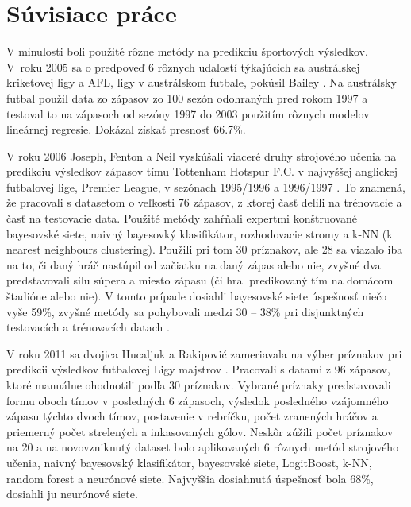 \section*{Súvisiace práce}

V minulosti boli použité rôzne metódy na predikciu športových výsledkov.
V~roku 2005 sa o predpoveď 6 rôznych udalostí týkajúcich sa austrálskej kriketovej ligy a AFL, ligy v austrálskom futbale, pokúsil Bailey \citep{related:bailey}. 
Na austrálsky futbal použil data zo zápasov zo 100 sezón odohraných pred rokom 1997 a testoval to na zápasoch od sezóny 1997 do 2003 použitím rôznych modelov lineárnej regresie. 
Dokázal získať presnosť 66.7\%.

V roku 2006 Joseph, Fenton a Neil vyskúšali viaceré druhy strojového učenia na predikciu výsledkov zápasov tímu Tottenham Hotspur F.C. v najvyššej anglickej futbalovej lige, Premier League, v sezónach 1995/1996 a 1996/1997 \citep{related:joseph}.
To znamená, že pracovali s datasetom o veľkosti 76 zápasov, z ktorej časť delili na trénovacie a časť na testovacie data. 
Použité metódy zahŕňali expertmi konštruované bayesovské siete, naivný bayesovký klasifikátor, rozhodovacie stromy a k-NN (k nearest neighbours clustering). 
Použili pri tom 30 príznakov, ale 28 sa viazalo iba na to, či daný hráč nastúpil od začiatku na daný zápas alebo nie, zvyšné dva predstavovali silu súpera a miesto zápasu (či hral predikovaný tím na domácom štadióne alebo nie).
V tomto prípade dosiahli bayesovské siete úspešnosť niečo vyše 59\%, zvyšné metódy sa pohybovali medzi 30 -- 38\% pri disjunktných testovacích a trénovacích datach  .

V roku 2011 sa dvojica Hucaljuk a Rakipovi{\'c} zameriavala na výber príznakov pri predikcii výsledkov futbalovej Ligy majstrov \citep{related:hucaljuk}. 
Pracovali s datami z 96 zápasov, ktoré manuálne ohodnotili podľa 30 príznakov.
Vybrané príznaky predstavovali formu oboch tímov v posledných 6 zápasoch, výsledok posledného vzájomného zápasu týchto dvoch tímov, postavenie v rebríčku, počet zranených hráčov a priemerný počet strelených a inkasovaných gólov.
Neskôr zúžili počet príznakov na 20 a na novovzniknutý dataset bolo aplikovaných 6 rôznych metód strojového učenia, naivný bayesovský klasifikátor, bayesovské siete, LogitBoost, k-NN, random forest a neurónové siete. Najvyššia dosiahnutá úspešnosť bola 68\%, dosiahli ju neurónové siete.

